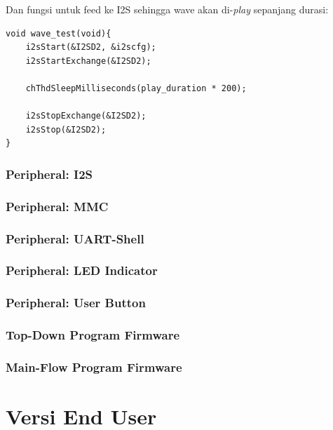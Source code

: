 \documentclass[12pt,]{article}
\begin{document}
	Dan fungsi untuk feed ke I2S sehingga wave akan di-\textit{play} sepanjang durasi:
	\begin{verbatim}
void wave_test(void){
	i2sStart(&I2SD2, &i2scfg);
	i2sStartExchange(&I2SD2);
	
	chThdSleepMilliseconds(play_duration * 200);
	
	i2sStopExchange(&I2SD2);
	i2sStop(&I2SD2);
}
	\end{verbatim}
	
	\subsubsection{Peripheral: I2S}
	\subsubsection{Peripheral: MMC}
	\subsubsection{Peripheral: UART-Shell}
	\subsubsection{Peripheral: LED Indicator}
	\subsubsection{Peripheral: User Button}
	\subsubsection{Top-Down Program Firmware}
	\subsubsection{Main-Flow Program Firmware}
	
	\newpage
	\section{Versi End User}
\end{document}
